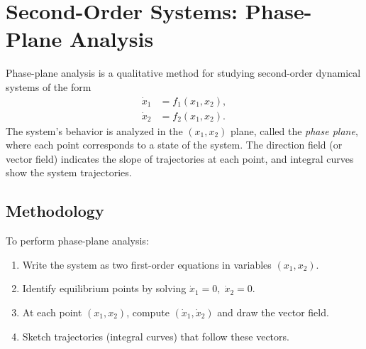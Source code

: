 \section{Second-Order Systems: Phase-Plane Analysis}

\begin{definition}
Phase-plane analysis is a qualitative method for studying second-order dynamical systems of the form
\begin{align}
    \dot{x}_1 &= f_1(x_1, x_2), \\
    \dot{x}_2 &= f_2(x_1, x_2).
\end{align}
The system’s behavior is analyzed in the $(x_1,x_2)$ plane, called the \emph{phase plane}, where each point corresponds to a state of the system.  
The direction field (or vector field) indicates the slope of trajectories at each point, and integral curves show the system trajectories.
\end{definition}

\subsection{Methodology}
To perform phase-plane analysis:
\begin{enumerate}
    \item Write the system as two first-order equations in variables $(x_1, x_2)$.
    \item Identify equilibrium points by solving $\dot{x}_1=0, \; \dot{x}_2=0$.
    \item At each point $(x_1,x_2)$, compute $(\dot{x}_1,\dot{x}_2)$ and draw the vector field.
    \item Sketch trajectories (integral curves) that follow these vectors.
\end{enumerate}

